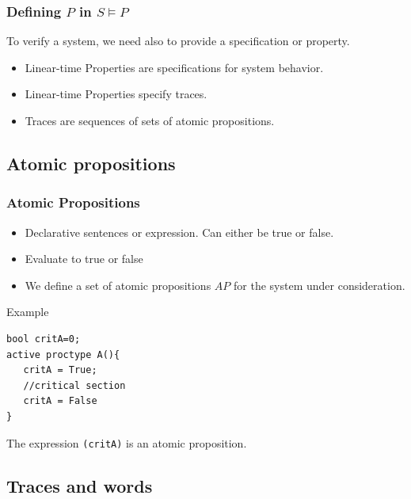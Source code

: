 \documentclass{beamer}
\begin{document}
\begin{frame}
  \frametitle{Defining $P$ in $S \models P$}
To verify a system, we need also to provide a specification or property.  
\begin{itemize}
\item Linear-time Properties are specifications for system behavior.
\item Linear-time Properties specify traces.
\item Traces are sequences of sets of atomic propositions.
\end{itemize}
\end{frame}

\subsection{Atomic propositions}

\begin{frame}[fragile]
  \frametitle{Atomic Propositions}
  \begin{itemize}
  \item Declarative sentences or expression. Can either be true or false.
  \item Evaluate to true or false
  \item We define a set of atomic propositions $AP$ for the system under consideration.
  \end{itemize}
  \begin{block}{Example}
\begin{lstlisting}
bool critA=0;
active proctype A(){
   critA = True;
   //critical section
   critA = False
}
\end{lstlisting}
The expression \texttt{(critA)} is an atomic proposition.
  \end{block}
\end{frame}

\subsection{Traces and words}
\end{document}
